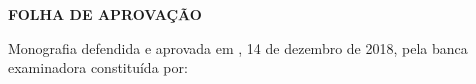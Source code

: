\documentclass[
	12pt,				%
	openright,			%
	twoside,			%
	a4paper,			%
	english,			%
	french,				%
	spanish,			%
	brazil				%
	]{abntex2}
\begin{document}

%
% 
%
\begin{folhadeaprovacao}
  \begin{center}
    {\ABNTEXchapterfont\large\imprimirautor}

    \vspace*{\fill}\vspace*{\fill}
    \begin{center}
    {\par \Large  \textbf{FOLHA DE APROVAÇÃO} \\ \par}
      \ABNTEXchapterfont\bfseries\Large\imprimirtitulo
    \end{center}
    \vspace*{\fill}
    
    \hspace{.45\textwidth}
    \begin{minipage}{.5\textwidth}
        \imprimirpreambulo
    \end{minipage}
    \vspace*{\fill}
   \end{center}
        
   Monografia defendida e aprovada em \imprimirlocal,  14 de dezembro de 2018, pela banca examinadora constituída por:

      
   \begin{center}
    \vspace*{0.5cm}
    {\large\imprimirlocal}
    \par
    {\large\imprimirdata}
    \vspace*{1cm}
  \end{center}
  
\end{folhadeaprovacao}
\end{document}
